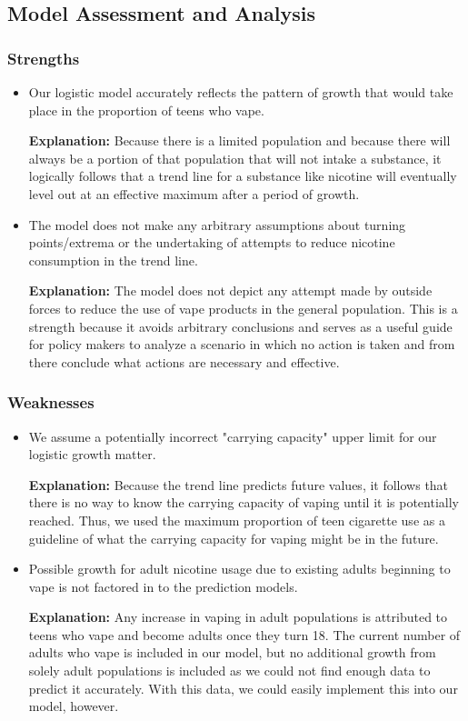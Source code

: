 \documentclass[12pt]{article}
\newcommand{\expl}{\textbf{Explanation: }}
\begin{document}
\subsection{Model Assessment and Analysis}
\subsubsection{Strengths}
\begin{itemize}
    \item Our logistic model accurately reflects the pattern of growth that would take place in the proportion of teens who vape. 
    
    \expl Because there is a limited population and because there will always be a portion of that population that will not intake a substance, it logically follows that a trend line for a substance like nicotine will eventually level out at an effective maximum after a period of growth.
    
    \item The model does not make any arbitrary assumptions about turning points/extrema or the undertaking of attempts to reduce nicotine consumption in the trend line.
    
    \expl The model does not depict any attempt made by outside forces to reduce the use of vape products in the general population. This is a strength because it avoids arbitrary conclusions and serves as a useful guide for policy makers to analyze a scenario in which no action is taken and from there conclude what actions are necessary and effective.

\end{itemize}

\subsubsection{Weaknesses}
\begin{itemize}
    \item We assume a potentially incorrect "carrying capacity" upper limit for our logistic growth matter.
    
    \expl Because the trend line predicts future values, it follows that there is no way to know the carrying capacity of vaping until it is potentially reached. Thus, we used the maximum proportion of teen cigarette use as a guideline of what the carrying capacity for vaping might be in the future. 
    
    \item Possible growth for adult nicotine usage due to existing adults beginning to vape is not factored in to the prediction models. 
    
    \expl Any increase in vaping in adult populations is attributed to teens who vape and become adults once they turn 18. The current number of adults who vape is included in our model, but no additional growth from solely adult populations is included as we could not find enough data to predict it accurately. With this data, we could easily implement this into our model, however.
\end{itemize}
\end{document}
